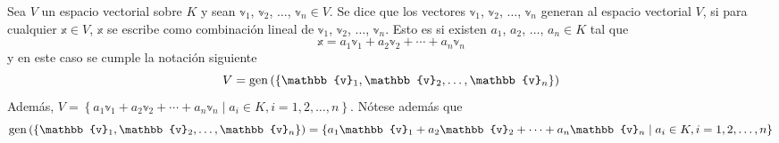\begin{definition}
    Sea $V$ un espacio vectorial sobre $K$ y sean $\mathbb{v}_1$, $\mathbb{v}_2$, $\dots$, $\mathbb{v}_n \in V$. Se dice que los vectores $\mathbb{v}_1$, $\mathbb{v}_2$, $\dots$, $\mathbb{v}_n$ generan al espacio vectorial $V$, si para cualquier $\mathbb{x} \in V$, $\mathbb{x}$ se escribe como combinación lineal de $\mathbb{v}_1$, $\mathbb{v}_2$, $\dots$, $\mathbb{v}_n$. Esto es si existen $a_1$, $a_2$, $\dots$, $a_n \in K$ tal que
    $$\mathbb{x} = a_1 \mathbb{v}_1 + a_2 \mathbb{v}_2 + \cdots + a_n \mathbb{v}_n$$
    y en este caso se cumple la notación siguiente
    $$V = \Gen \left( \left\{ \mathbb{v}_1, \mathbb{v}_2, \dots,  \mathbb{v}_n \right\} \right)$$
    Además, $V = \left\{ a_1 \mathbb{v}_1 + a_2 \mathbb{v}_2 + \cdots + a_n \mathbb{v}_n \mid a_i \in K, i = 1, 2, \dots, n \right\}$. Nótese además que
    $$\Gen \left( \{ \mathbb{v}_1, \mathbb{v}_2, \dots, \mathbb{v}_n \} \right) = \left\{ a_1 \mathbb{v}_1 + a_2 \mathbb{v}_2 + \cdots + a_n \mathbb{v}_n \mid a_i \in K, i = 1, 2, \dots, n \right\}$$
\end{definition}

